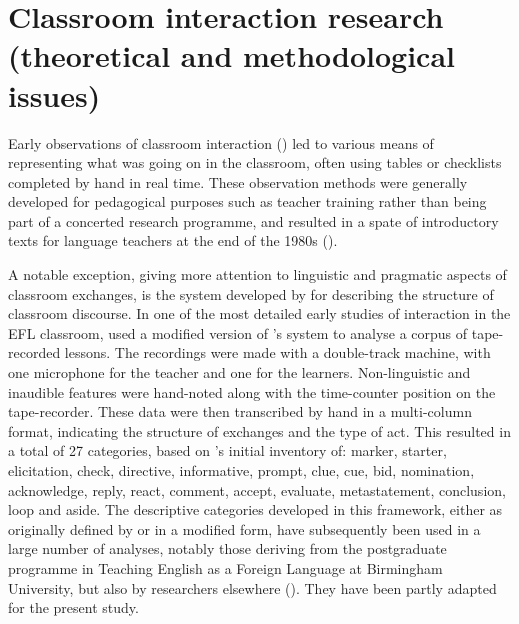 \documentclass[output=paper,colorlinks,citecolor=brown,modfonts,nonflat]{../langscibook}
\begin{document}
\section{Classroom interaction research (theoretical and methodological issues)}\label{sec:hilton:2}

Early observations of classroom interaction (\citealt{Flanders1970,Brown1975,Moskowitz1976,Bowers1980,AllenEtAl1983,UllmannGeva1982, UllmannGeva1984}) led to various means of representing what was going on in the classroom, often using tables or checklists completed by hand in real time. These observation methods were generally developed for pedagogical purposes such as teacher training rather than being part of a concerted research programme, and resulted in a spate of introductory texts for language teachers at the end of the 1980s (\citealt{Allwright1988,Chaudron1988,Lier1988,Nunan1989}).

A notable exception, giving more attention to linguistic and pragmatic aspects of classroom exchanges, is the system developed by \citet{SinclairCoulthard1975} for describing the structure of classroom discourse. In one of the most detailed early studies of interaction in the EFL classroom, \citet{Willis1981} used a modified version of \citeauthor{SinclairCoulthard1975}’s system to analyse a corpus of tape-recorded lessons. The recordings were made with a double-track machine, with one microphone for the teacher and one for the learners. Non-linguistic and inaudible features were hand-noted along with the time-counter position on the tape-recorder. These data were then transcribed by hand in a multi-column format, indicating the structure of exchanges and the type of act. This resulted in a total of 27 categories, based on \citeauthor{SinclairCoulthard1975}’s initial inventory of: marker, starter, elicitation, check, directive, informative, prompt, clue, cue, bid, nomination, acknowledge, reply, react, comment, accept, evaluate, metastatement, conclusion, loop and aside. The descriptive categories developed in this framework, either as originally defined by \citeauthor{SinclairCoulthard1975} or in a modified form, have subsequently been used in a large number of analyses, notably those deriving from the postgraduate programme in Teaching English as a Foreign Language at Birmingham University, but also by researchers elsewhere (\citealt{Chaudron1977, GrandcolasSoulé-Susbielles1986, Chapelle1990}). They have been partly adapted for the present study.
\end{document}
